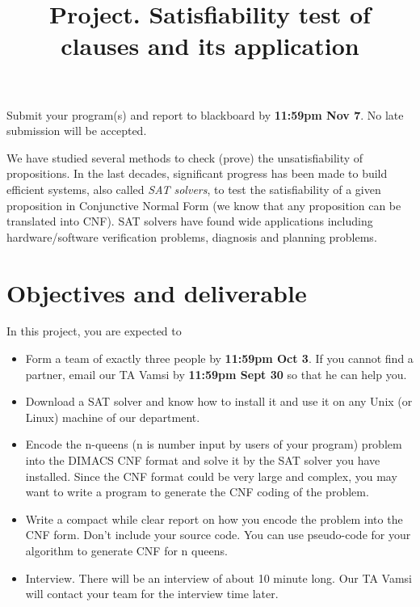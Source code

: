 \documentclass[12pt, letterpaper]{article}
\newcommand{\teamFormDate} 
{11:59pm Oct 3}
\newcommand{\teamFormHelpDate} 
{11:59pm Sept 30}
\newcommand{\dueDate} 
{11:59pm \dueWeek}
\newcommand{\dueWeek} 
{Nov 7}
\newcommand{\TA}
{
    Arsu
}
\newcommand{\projecttitle} {
  Satisfiability test of clauses and its application
}
\begin{document}
\newcommand{\hide}[1]{}
\newcommand{\set}[1]{\{#1\}}
\newcommand{\pg}[1]{{\tt #1}}
\newtheorem{definition}{Definition}




\title{{\bf Project.} \projecttitle}
\date{} 
\maketitle





\begin{center}
Submit your program(s) and report to blackboard by  {\bf \dueDate}.  No late submission will be accepted. 
\end{center}
We have studied several methods to check (prove) the
unsatisfiability of propositions. In the last decades, significant
progress has been made to build efficient systems, also called {\em
SAT solvers}, to test the satisfiability of a given proposition in
Conjunctive Normal Form (we know that any proposition can be
translated into CNF). SAT solvers have found wide applications
including hardware/software verification problems, diagnosis and
planning problems.

\section{Objectives and deliverable}

In this project, you are expected to
\begin{itemize}
\item Form a team of exactly three people by {\bf \teamFormDate}. If you cannot find a partner, email our TA Vamsi by {\bf \teamFormHelpDate} so that he can help you. 
\item Download a SAT solver and know how to install it and use it on any Unix
(or Linux) machine of our department.
\item Encode the n-queens (n is number input by users of your program) problem into the DIMACS
CNF format and solve it by the SAT solver you have installed. Since
the CNF format could be very large and complex, you may want to
write a program to generate the CNF coding of the problem.
\item Write a compact while clear report 
on how you encode the problem into the CNF form. Don't include your source code. You can use pseudo-code for your algorithm to generate CNF for n queens. 
\item Interview. There will be an interview of about 10 minute long. Our TA Vamsi will contact your team for the interview time later. 
\end{itemize}
\end{document}
